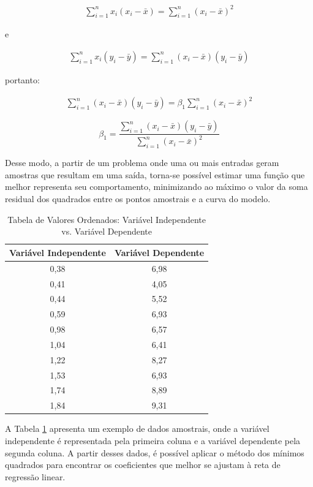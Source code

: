 \begin{gather*}
	\sum_{i=1}^n x_i (x_i - \bar{x}) = \sum_{i=1}^n (x_i - \bar{x})^2
\end{gather*}

e

\begin{gather*}
	\sum_{i=1}^n x_i (y_i - \bar{y}) = \sum_{i=1}^n (x_i - \bar{x})(y_i - \bar{y})	
\end{gather*}

portanto:

\begin{gather*}
	\sum_{i=1}^n (x_i - \bar{x})(y_i - \bar{y}) = \beta_1 \sum_{i=1}^n (x_i - \bar{x})^2
\end{gather*}

\begin{equation}
	\beta_1 = \frac{\sum_{i=1}^n (x_i - \bar{x})(y_i - \bar{y})}{\sum_{i=1}^n (x_i - \bar{x})^2}
\end{equation}




Desse modo, a partir de um problema onde uma ou mais entradas geram amostras que resultam em uma saída, torna-se possível estimar uma função que melhor representa seu comportamento, minimizando ao máximo o valor da soma residual dos quadrados entre os pontos amostrais e a curva do modelo. 

\begin{table}[h!]
\centering
\begin{tabular}{|c|c|}
\hline
\textbf{Variável Independente} & \textbf{Variável Dependente} \\
\hline
0,38 & 6,98 \\
0,41 & 4,05 \\
0,44 & 5,52 \\
0,59 & 6,93 \\
0,98 & 6,57 \\
1,04 & 6,41 \\
1,22 & 8,27 \\
1,53 & 6,93 \\
1,74 & 8,89 \\
1,84 & 9,31 \\
\hline
\end{tabular}
\caption{Tabela de Valores Ordenados: Variável Independente vs. Variável Dependente}
\label{tab:valores_exemplo_mqo}
\end{table}

A Tabela \ref{tab:valores_exemplo_mqo} apresenta um exemplo de dados amostrais, onde a variável independente é representada pela primeira coluna e a variável dependente pela segunda coluna. A partir desses dados, é possível aplicar o método dos mínimos quadrados para encontrar os coeficientes que melhor se ajustam à reta de regressão linear.

